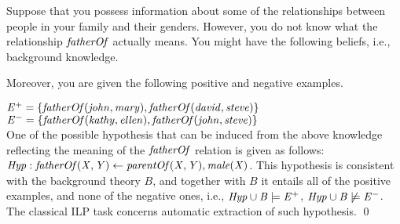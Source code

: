 \begin{example}
\label{ex:ilp}
Suppose that you possess information about some of the relationships between people in your family and their genders.
However, you do not know what the relationship $\mathit{fatherOf}$ actually means. 
You might have the following beliefs, i.e., background knowledge.
\smallskip

{}
\smallskip

Moreover, you are given the following positive and negative examples.
\smallskip

\noindent $\mathit{E^+=\{fatherOf(john, mary), fatherOf(david, steve)\}}$\\
$\mathit{E^-=\{fatherOf(kathy, ellen), fatherOf(john, steve)\}}$\\

One of the possible hypothesis that can be induced from the above knowledge reflecting the meaning of the $\mathit{fatherOf}$ relation is given as follows:\\
$\mathit{Hyp: fatherOf(X, Y)\leftarrow parentOf(X,Y), male(X)}$. This hypothesis is consistent with the background theory $B$, and together with $B$ it entails all of the positive examples, and none of the negative ones, i.e., $\mathit{Hyp \cup B \models E^+}$, $\mathit{Hyp \cup B \not \models E^-}$. The classical ILP task concerns automatic extraction of such hypothesis. \qed
\end{example}


